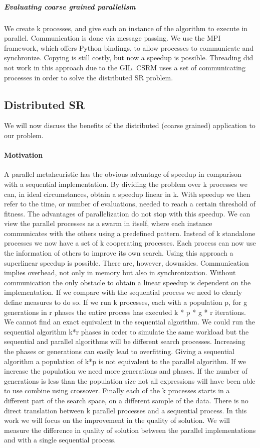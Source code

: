 \subparagraph{Evaluating coarse grained parallelism}
We create k processes, and give each an instance of the algorithm to execute in parallel. Communication is done via message passing. We use the MPI framework, which offers Python bindings, to allow processes to communicate and synchronize. Copying is still costly, but now a speedup is possible. Threading did not work in this approach due to the GIL.
CSRM uses a set of communicating processes in order to solve the distributed SR problem.

\subsection{Distributed SR}
We will now discuss the benefits of the distributed (coarse grained) application to our problem.

\paragraph{Motivation}
A parallel metaheuristic has the obvious advantage of speedup in comparison with a sequential implementation. By dividing the problem over k processes we can, in ideal circumstances, obtain a speedup linear in k. With speedup we then refer to the time, or number of evaluations, needed to reach a certain threshold of fitness. The advantages of parallelization do not stop with this speedup. We can view the parallel processes as a swarm in itself, where each instance communicates with the others using a predefined pattern. Instead of k standalone processes we now have a set of k cooperating  processes. Each process can now use the information of others to improve its own search. Using this approach a superlinear speedup is possible. There are, however, downsides. Communication implies overhead, not only in memory but also in synchronization. Without communication the only obstacle to obtain a linear speedup is dependent on the implementation. If we compare with the sequential process we need to clearly define measures to do so. If we run k processes, each with a population p, for g generations in r phases the entire process has executed k * p * g * r iterations. We cannot find an exact equivalent in the sequential algorithm. We could run the sequential algorithm k*r phases in order to simulate the same workload but the sequential and parallel algorithms will be different search processes. Increasing the phases or generations can easily lead to overfitting. Giving a sequential algorithm a population of k*p is not equivalent to the parallel algorithm. If we increase the population we need more generations and phases. If the number of generations is less than the population size not all expressions will have been able to use combine using crossover. Finally each of the k processes starts in a different part of the search space, on a different sample of the data. There is no direct translation between k parallel processes and a sequential process. 
In this work we will focus on the improvement in the quality of solution. We will measure the difference in quality of solution between the parallel implementations and with a single sequential process. 

